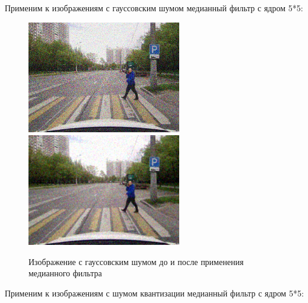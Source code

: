 \pagebreak
Применим к изображениям с гауссовским шумом медианный фильтр с ядром 5*5:

\begin{figure}[hbt!]
    \centering
    \includegraphics[width=0.6\textwidth]{../outputs/image_gauss_noise.png}
    \includegraphics[width=0.6\textwidth]{../addition/image_gauss_median_filter_k5.png}
    \caption{Изображение с гауссовским шумом до и после применения медианного фильтра}
    \label{fig:stich_images}
\end{figure}

\pagebreak
Применим к изображениям с шумом квантизации медианный фильтр с ядром 5*5:

